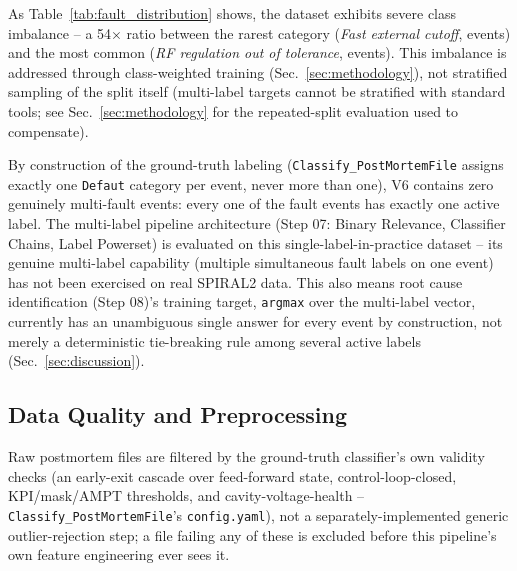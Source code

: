 As Table~\ref{tab:fault_distribution} shows, the dataset exhibits severe class imbalance -- a 54$\times$ ratio %
between the rarest category (\textit{Fast external cutoff}, \MetricZeroZeroDataAttritionChainGtPassingCoupureExterneRapide{} events) and the most common (\textit{RF regulation out of tolerance}, \MetricZeroZeroDataAttritionChainGtPassingRGSignalRfHorsTolRance{} events). This imbalance is addressed through class-weighted training (Sec.~\ref{sec:methodology}), not stratified sampling of the split itself (multi-label targets cannot be stratified with standard tools; see Sec.~\ref{sec:methodology} for the repeated-split evaluation used to compensate).

By construction of the ground-truth labeling (\texttt{Classify\_PostMortemFile} assigns exactly one \texttt{Defaut} category per event, never more than one), V6 contains zero genuinely multi-fault events: every one of the \MetricZeroEightPhaseThreeaRootcauseNFaultEvents{} fault events has exactly one active label. The multi-label pipeline architecture (Step 07: Binary Relevance, Classifier Chains, Label Powerset) %
is evaluated on this single-label-in-practice dataset -- its genuine multi-label capability (multiple simultaneous fault labels on one event) has not been exercised on real SPIRAL2 data. This also means root cause identification (Step 08)'s %
training target, \texttt{argmax} over the multi-label vector, currently has an unambiguous single answer for every event by construction, not merely a deterministic tie-breaking rule among several active labels (Sec.~\ref{sec:discussion}).

\subsection{Data Quality and Preprocessing}

Raw postmortem files are filtered by the ground-truth classifier's own validity checks (an early-exit cascade over feed-forward state, control-loop-closed, KPI/mask/AMPT thresholds, and cavity-voltage-health -- \texttt{Classify\_PostMortemFile}'s \texttt{config.yaml}), not a separately-implemented generic outlier-rejection step; a file failing any of these is excluded before this pipeline's own feature engineering ever sees it. %

